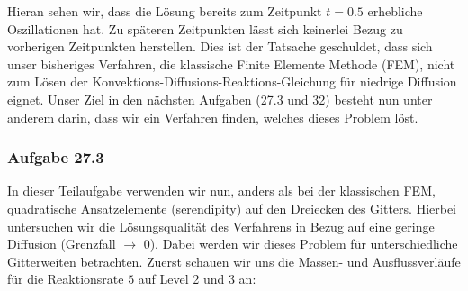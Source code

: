 Hieran sehen wir, dass die Lösung bereits zum Zeitpunkt $t=0.5$
erhebliche Oszillationen hat. Zu späteren Zeitpunkten lässt sich keinerlei Bezug zu vorherigen Zeitpunkten herstellen. Dies ist der Tatsache geschuldet, dass sich unser bisheriges Verfahren, die klassische Finite Elemente Methode (FEM), nicht zum Lösen der Konvektions-Diffusions-Reaktions-Gleichung für niedrige Diffusion eignet.
Unser Ziel in den nächsten Aufgaben (27.3 und 32) besteht nun unter anderem darin, dass wir ein Verfahren finden, welches dieses Problem löst.

\subsubsection{Aufgabe 27.3}
In dieser Teilaufgabe verwenden wir nun, anders als bei der klassischen FEM, quadratische Ansatzelemente (serendipity) auf den Dreiecken des Gitters. Hierbei untersuchen wir die Lösungsqualität des Verfahrens in Bezug auf eine geringe Diffusion (Grenzfall $\to$ 0). Dabei werden wir dieses Problem für unterschiedliche Gitterweiten betrachten.
Zuerst schauen wir uns die Massen- und Ausflussverläufe für die Reaktionsrate $5$ auf Level 2 und 3 an:

